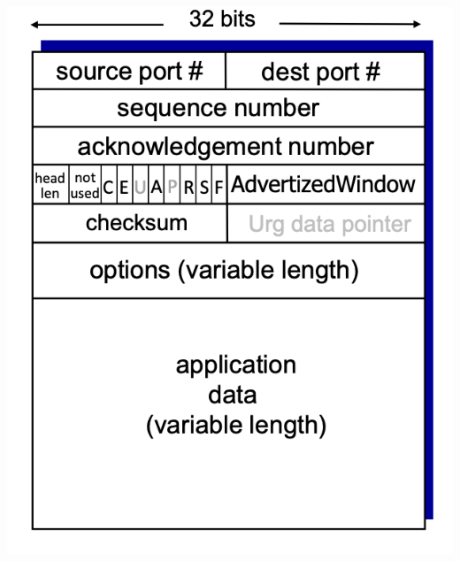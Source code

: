 \begin{multicols}{2}
\begin{itemize}
\begin{center}
		\includegraphics[scale=0.25]{images/TCP_Segment.png}
	\end{center} 
\end{itemize}	
\end{multicols}
